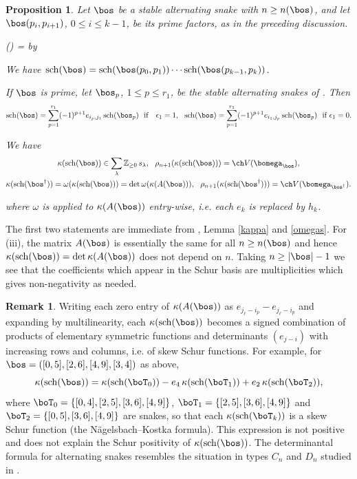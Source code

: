 \documentclass[11pt,reqno]{amsart}
\newtheorem*{prop}{Proposition}
\theoremstyle{definition} \newtheorem*{defn}{Definition}
\theoremstyle{definition}
\newtheorem*{rem}{Remark}
\newenvironment{pf}{\proof}{\endproof}
\newcounter{cnt}
\newenvironment{enumerit}{\begin{list}{{\hfill\rm(\roman{cnt})\hfill}}{%
\settowidth{\labelwidth}{{\rm(iv)}}\leftmargin=\labelwidth%
\advance\leftmargin by \labelsep\rightmargin=0pt\usecounter{cnt}}}{\end{list}} \makeatletter
\numberwithin{equation}{section}
\begin{document}
\begin{prop}\label{salt} Let $\bos$ be a stable alternating snake with $n\ge n(\bos)$, and let $\bos(p_i,p_{i+1})$, $0\le i\le k-1$, be its prime
factors, as in the preceding discussion.
\begin{enumerit}
\item[(i)] We have ${\rm sch}(\bos)={\rm sch}(\bos(p_0, p_1))\cdots{\rm sch}(\bos(p_{k-1}, p_k))$.
\item[(ii)] If $\bos$ is prime, let $\bos_p$, $1\le p\le r_1$, be the stable alternating snakes of \cite[Section 6]{BC25a}. Then
\begin{gather*}{\rm sch}(\bos)=\sum_{p=1}^{r_1}(-1)^{p+1}e_{i_p,j_1}\,{\rm sch}(\bos_p)\ \ \text{if }\ \ \epsilon_1=1,\ \
{\rm sch}(\bos)=\sum_{p=1}^{r_1}(-1)^{p+1}e_{i_1,j_p}\,{\rm sch}(\bos_p)\ \ \text{if $\epsilon_1=0$}.\end{gather*}
\item[(iii)] We have \begin{gather*}\kappa({\rm sch}(\bos))\in\sum_\lambda\mathbb Z_{\ge0}\,s_\lambda,\ \ \rho_{n+1}(\kappa({\rm sch}(\bos)))=\ch V(\bomega_\bos),\\ \kappa({\rm sch}(\bos^\dagger))=\omega(\kappa({\rm sch}(\bos)))=\det\omega(\kappa(A(\bos))),\ \ \rho_{n+1}(\kappa({\rm sch}(\bos^\dagger)))=\ch V(\bomega_{\bos^\dagger}).\end{gather*} 
\end{enumerit}
where  $\omega$ is applied to
$\kappa(A(\bos))$ entry-wise, i.e. each $e_k$ is replaced by $h_k$.
\end{prop}
\begin{pf}
    The first two statements are immediate from \cite[Theorem 3, Propositions 6.1--6.3]{BC25a}, Lemma \ref{kappa} and
\eqref{omegas}.  For (iii), the matrix $A(\bos)$ is essentially the same for all $n\ge n(\bos)$ and hence  $\kappa({\rm sch}(\bos))=\det\kappa(A(\bos))$ does not depend on $n$.  Taking $n\ge|\bos|-1$ we see that  the coefficients which appear in the Schur basis are multiplicities which gives non-negativity as needed.
\end{pf}


\begin{rem}\label{zeroexp} Writing each zero entry of $\kappa(A(\bos))$ as $e_{j_\ell-i_p}-e_{j_\ell-i_p}$ and expanding by
multilinearity, each $\kappa({\rm sch}(\bos))$ becomes a signed combination of products of elementary symmetric functions and
determinants $(e_{j-i})$ with increasing rows and columns, i.e. of skew Schur functions. For example, for
$\bos=([0,5],[2,6],[4,9],[3,4])$ as above,
$$\kappa({\rm sch}(\bos))=\kappa({\rm sch}(\boT_0))-e_4\,\kappa({\rm sch}(\boT_1))+e_2\,\kappa({\rm sch}(\boT_2)),$$
where $\boT_0=\{[0,4],[2,5],[3,6],[4,9]\}$, $\boT_1=\{[2,5],[3,6],[4,9]\}$ and $\boT_2=\{[0,5],[3,6],[4,9]\}$ are snakes, so that
each $\kappa({\rm sch}(\boT_k))$ is a skew Schur function (the N\"agelsbach--Kostka formula). This expression is not positive and does
not explain the Schur positivity of $\kappa({\rm sch}(\bos))$.
The determinantal formula for alternating snakes  resembles the situation in types
$C_n$ and $D_n$ studied in \cite{NN06,NN07}.
\end{rem}
\end{document}
